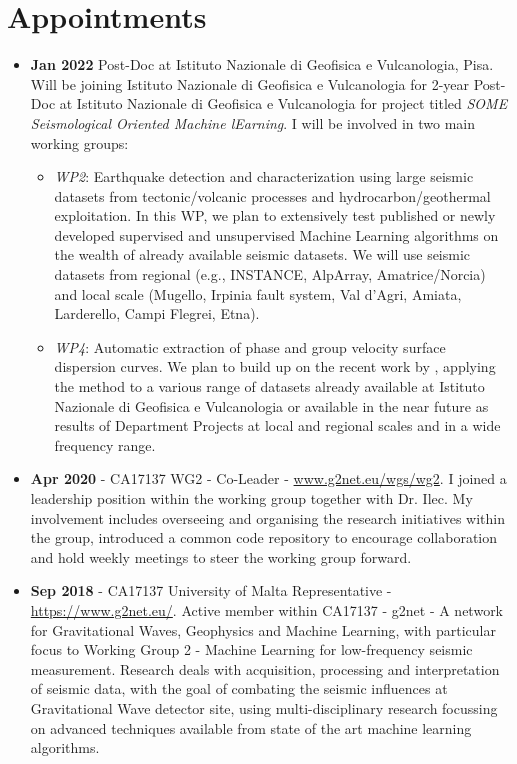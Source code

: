 \section{Appointments}
\begin{itemize}
    \item \textbf{Jan 2022} Post-Doc at Istituto Nazionale di Geofisica e Vulcanologia, Pisa.
    \newline Will be joining Istituto Nazionale di Geofisica e Vulcanologia for 2-year Post-Doc at Istituto Nazionale di Geofisica e Vulcanologia for project titled \emph{SOME Seismological Oriented Machine lEarning}. I will be involved in two main working groups:
    \begin{itemize}
        \item \emph{WP2}: Earthquake detection and characterization using large seismic datasets from tectonic/volcanic processes and hydrocarbon/geothermal exploitation. In this WP, we plan to extensively test published or newly developed supervised and unsupervised Machine Learning algorithms on the wealth of already available seismic datasets. We will use seismic datasets from regional (e.g., INSTANCE, AlpArray, Amatrice/Norcia) and local scale (Mugello, Irpinia fault system, Val d’Agri, Amiata, Larderello, Campi Flegrei, Etna).
        \item \emph{WP4}: Automatic extraction of phase and group velocity surface dispersion curves. We plan to build up on the recent work by \citet{Zhang2020}, applying the method to a various range of datasets already available at Istituto Nazionale di Geofisica e Vulcanologia \citep{Molinari2015,Molinari2020} or available in the near future as results of Department Projects at local and regional scales and in a wide frequency range.
    \end{itemize}
    \item \textbf{Apr 2020} - CA17137 WG2 - Co-Leader - \href{https://www.g2net.eu/wgs/wg2-machine-learning-for-low-frequency-seismic-measurement}{\url{www.g2net.eu/wgs/wg2}}. \newline I joined a leadership position within the working group together with Dr. Ilec. My involvement includes overseeing and organising the research initiatives within the group, introduced a common code repository to encourage collaboration and hold weekly meetings to steer the working group forward.
    \item \textbf{Sep 2018} - CA17137 University of Malta Representative - \url{https://www.g2net.eu/}. \newline Active member within CA17137 - g2net - A network for Gravitational Waves, Geophysics and Machine Learning, with particular focus to Working Group 2 - Machine Learning for low-frequency seismic measurement. Research deals with acquisition, processing and interpretation of seismic data, with the goal of combating the seismic influences at Gravitational Wave detector site, using multi-disciplinary research focussing on advanced techniques available from state of the art machine learning algorithms. 
\end{itemize}

